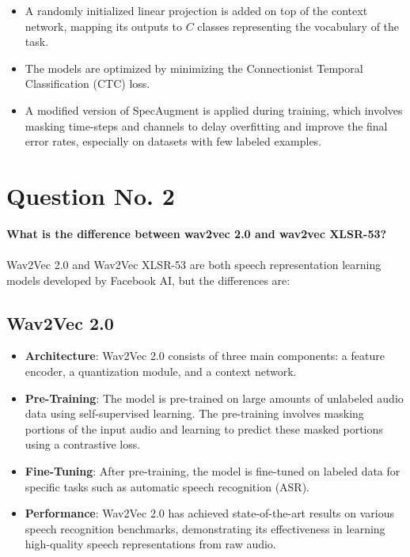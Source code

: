 \documentclass{article}
\begin{document}
\begin{itemize}
  \item A randomly initialized linear projection is added on top of the context network, mapping its outputs to \( C \) classes representing the vocabulary of the task.
  \item The models are optimized by minimizing the Connectionist Temporal Classification (CTC) loss.
  \item A modified version of SpecAugment is applied during training, which involves masking time-steps and channels to delay overfitting and improve the final error rates, especially on datasets with few labeled examples.
\end{itemize}

\pagebreak

\section*{Question No. 2}
\textbf{What is the difference between wav2vec 2.0 and wav2vec XLSR-53?}\\\\
Wav2Vec 2.0 and Wav2Vec XLSR-53 are both speech representation learning models developed by Facebook AI, but the differences are:

\subsection*{Wav2Vec 2.0}
\begin{itemize}
  \item \textbf{Architecture}: Wav2Vec 2.0 consists of three main components: a feature encoder, a quantization module, and a context network.
  \item \textbf{Pre-Training}: The model is pre-trained on large amounts of unlabeled audio data using self-supervised learning. The pre-training involves masking portions of the input audio and learning to predict these masked portions using a contrastive loss.
  \item \textbf{Fine-Tuning}: After pre-training, the model is fine-tuned on labeled data for specific tasks such as automatic speech recognition (ASR).
  \item \textbf{Performance}: Wav2Vec 2.0 has achieved state-of-the-art results on various speech recognition benchmarks, demonstrating its effectiveness in learning high-quality speech representations from raw audio.
\end{itemize}
\end{document}
